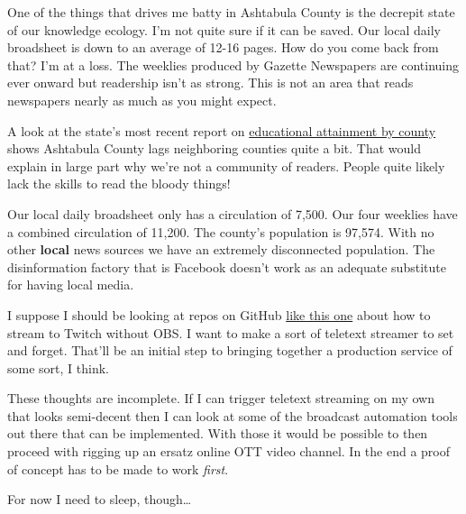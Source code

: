 One of the things that drives me batty in Ashtabula County is the
decrepit state of our knowledge ecology. I'm not quite sure if it can be
saved. Our local daily broadsheet is down to an average of 12-16 pages.
How do you come back from that? I'm at a loss. The weeklies produced by
Gazette Newspapers are continuing ever onward but readership isn't as
strong. This is not an area that reads newspapers nearly as much as you
might expect.

A look at the state's most recent report on
\href{https://ohiolmi.com/home/CountyProfiles/Educational_Attainment}{educational
attainment by county} shows Ashtabula County lags neighboring counties
quite a bit. That would explain in large part why we're not a community
of readers. People quite likely lack the skills to read the bloody
things!

Our local daily broadsheet only has a circulation of 7,500. Our four
weeklies have a combined circulation of 11,200. The county's population
is 97,574. With no other \textbf{local} news sources we have an
extremely disconnected population. The disinformation factory that is
Facebook doesn't work as an adequate substitute for having local media.

I suppose I should be looking at repos on GitHub
\href{https://github.com/jimbobbennett/RaspberryPiTwitchStreamer}{like
this one} about how to stream to Twitch without OBS. I want to make a
sort of teletext streamer to set and forget. That'll be an initial step
to bringing together a production service of some sort, I think.

These thoughts are incomplete. If I can trigger teletext streaming on my
own that looks semi-decent then I can look at some of the broadcast
automation tools out there that can be implemented. With those it would
be possible to then proceed with rigging up an ersatz online OTT video
channel. In the end a proof of concept has to be made to work
\emph{first}.

For now I need to sleep, though\ldots{}

